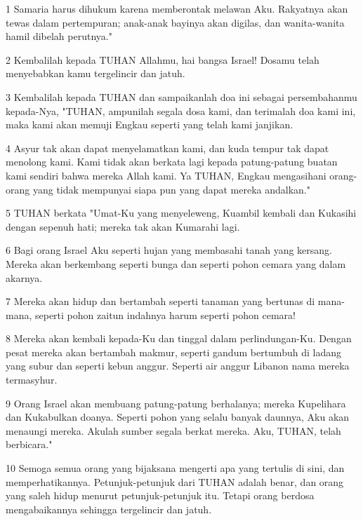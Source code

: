 \par 1 Samaria harus dihukum karena memberontak melawan Aku. Rakyatnya akan tewas dalam pertempuran; anak-anak bayinya akan digilas, dan wanita-wanita hamil dibelah perutnya."
\par 2 Kembalilah kepada TUHAN Allahmu, hai bangsa Israel! Dosamu telah menyebabkan kamu tergelincir dan jatuh.
\par 3 Kembalilah kepada TUHAN dan sampaikanlah doa ini sebagai persembahanmu kepada-Nya, "TUHAN, ampunilah segala dosa kami, dan terimalah doa kami ini, maka kami akan memuji Engkau seperti yang telah kami janjikan.
\par 4 Asyur tak akan dapat menyelamatkan kami, dan kuda tempur tak dapat menolong kami. Kami tidak akan berkata lagi kepada patung-patung buatan kami sendiri bahwa mereka Allah kami. Ya TUHAN, Engkau mengasihani orang-orang yang tidak mempunyai siapa pun yang dapat mereka andalkan."
\par 5 TUHAN berkata "Umat-Ku yang menyeleweng, Kuambil kembali dan Kukasihi dengan sepenuh hati; mereka tak akan Kumarahi lagi.
\par 6 Bagi orang Israel Aku seperti hujan yang membasahi tanah yang kersang. Mereka akan berkembang seperti bunga dan seperti pohon cemara yang dalam akarnya.
\par 7 Mereka akan hidup dan bertambah seperti tanaman yang bertunas di mana-mana, seperti pohon zaitun indahnya harum seperti pohon cemara!
\par 8 Mereka akan kembali kepada-Ku dan tinggal dalam perlindungan-Ku. Dengan pesat mereka akan bertambah makmur, seperti gandum bertumbuh di ladang yang subur dan seperti kebun anggur. Seperti air anggur Libanon nama mereka termasyhur.
\par 9 Orang Israel akan membuang patung-patung berhalanya; mereka Kupelihara dan Kukabulkan doanya. Seperti pohon yang selalu banyak daunnya, Aku akan menaungi mereka. Akulah sumber segala berkat mereka. Aku, TUHAN, telah berbicara."
\par 10 Semoga semua orang yang bijaksana mengerti apa yang tertulis di sini, dan memperhatikannya. Petunjuk-petunjuk dari TUHAN adalah benar, dan orang yang saleh hidup menurut petunjuk-petunjuk itu. Tetapi orang berdosa mengabaikannya sehingga tergelincir dan jatuh.


